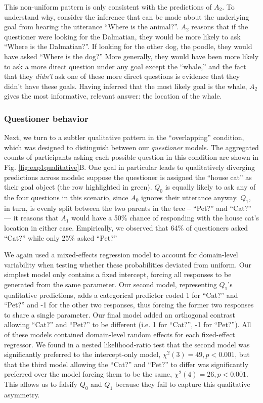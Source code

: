 \documentclass[11pt, floatsintext]{apa6}
\begin{document}
This non-uniform pattern is only consistent with the predictions of $A_2$. 
To understand why, consider the inference that can be made about the underlying goal from hearing the utterance ``Where is the animal?''.
$A_2$ reasons that if the questioner were looking for the Dalmatian, they would be more likely to ask ``Where is the Dalmatian?''. 
If looking for the other dog, the poodle, they would have asked ``Where is the dog?''
More generally, they would have been more likely to ask a more direct question under any goal except the ``whale,'' and the fact that they \emph{didn't} ask one of these more direct questions is evidence that they didn't have these goals.
Having inferred that the most likely goal is the whale, $A_2$ gives the most informative, relevant answer: the location of the whale.

\subsubsection{Questioner behavior}
Next, we turn to a subtler qualitative pattern in the ``overlapping'' condition, which was designed to distinguish between our \emph{questioner} models. 
The aggregated counts of participants asking each possible question in this condition are shown in Fig. \ref{fig:exp1qualitative}B. 
One goal in particular leads to qualitatively diverging predictions across models: suppose the questioner is assigned the ``house cat'' as their goal object (the row highlighted in green). 
$Q_0$ is equally likely to ask any of the four questions in this scenario, since $A_0$ ignores their utterance anyway. 
$Q_1$, in turn, is evenly split between the two parents in the tree -- ``Pet?'' and ``Cat?'' --- it reasons that $A_1$ would have a 50\% chance of responding with the house cat's location in either case. 
Empirically, we observed that 64\% of questioners asked ``Cat?'' while only 25\% asked ``Pet?''

We again used a mixed-effects regression model to account for domain-level variability when testing whether these probabilities deviated from uniform.
Our simplest model only contains a fixed intercept, forcing all responses to be generated from the same parameter.
Our second model, representing $Q_1$'s qualitative predictions, adds a categorical predictor coded 1 for ``Cat?'' and ``Pet?'' and -1 for the other two responses, thus forcing the former two responses to share a single parameter.
Our final model added an orthogonal contrast allowing ``Cat?'' and ``Pet?'' to be different (i.e. 1 for ``Cat?'', -1 for ``Pet?''). 
All of these models contained domain-level random effects for each fixed-effect regressor.
We found in a nested likelihood-ratio test that the second model was significantly preferred to the intercept-only model, $\chi^2(3) = 49, p < 0.001$, but that the third model allowing the ``Cat?'' and ``Pet?'' to differ was significantly preferred over the model forcing them to be the same, $\chi^2(4) = 26, p < 0.001$.
This allows us to falsify $Q_0$ and $Q_1$ because they fail to capture this qualitative asymmetry.
\end{document}
